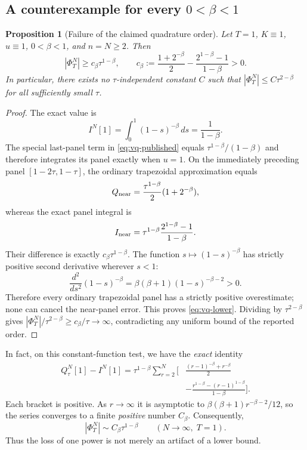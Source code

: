\documentclass[11pt,a4paper]{amsart}
\theoremstyle{remark}
\theoremstyle{plain}
\newtheorem{proposition}{Proposition}[section]
\theoremstyle{remark}
\numberwithin{equation}{section}
\begin{document}
\subsection{A counterexample for every $0<\beta<1$}
\begin{proposition}[Failure of the claimed quadrature order]\label{prop:vq-counter}
Let $T=1$, $K\equiv1$, $u\equiv1$, $0<\beta<1$, and $n=N\ge2$. Then
\begin{equation}\label{eq:vq-lower}
 |\Phi_T^N|\ge c_\beta\tau^{1-\beta},\qquad
 c_\beta:=\frac{1+2^{-\beta}}2
 -\frac{2^{1-\beta}-1}{1-\beta}>0.
\end{equation}
In particular, there exists no $\tau$-independent constant $C$ such that
$|\Phi_T^N|\le C\tau^{2-\beta}$ for all sufficiently small $\tau$.
\end{proposition}
\begin{proof}
The exact value is
\[
 I^N[1]=\int_0^1(1-s)^{-\beta}\,ds=\frac1{1-\beta}.
\]
The special last-panel term in \eqref{eq:vq-published} equals
$\tau^{1-\beta}/(1-\beta)$ and therefore integrates its panel exactly when $u=1$.
On the immediately preceding panel $[1-2\tau,1-\tau]$, the ordinary trapezoidal approximation equals
\[
 Q_{\rm near}=\frac{\tau^{1-\beta}}2(1+2^{-\beta}),
\]
whereas the exact panel integral is
\[
 I_{\rm near}=\tau^{1-\beta}
 \frac{2^{1-\beta}-1}{1-\beta}.
\]
Their difference is exactly $c_\beta\tau^{1-\beta}$. The function
$s\mapsto(1-s)^{-\beta}$ has strictly positive second derivative wherever $s<1$:
\[
 \frac{d^2}{ds^2}(1-s)^{-\beta}
 =\beta(\beta+1)(1-s)^{-\beta-2}>0.
\]
Therefore every ordinary trapezoidal panel has a strictly positive overestimate; none can cancel the near-panel error. This proves \eqref{eq:vq-lower}.
Dividing by $\tau^{2-\beta}$ gives
$|\Phi_T^N|/\tau^{2-\beta}\ge c_\beta/\tau\to\infty$, contradicting any uniform bound of the reported order.
\end{proof}

In fact, on this constant-function test, we have the \emph{exact} identity
\begin{equation}\label{eq:vq-error-sum}
\begin{aligned}
 Q_\tau^N[1]-I^N[1]=\tau^{1-\beta}\sum_{r=2}^N\bigg[
 &\frac{(r-1)^{-\beta}+r^{-\beta}}2\\
 &-\frac{r^{1-\beta}-(r-1)^{1-\beta}}{1-\beta}
 \bigg].
\end{aligned}
\end{equation}
Each bracket is positive. As $r\to\infty$ it is asymptotic to
$\beta(\beta+1)r^{-\beta-2}/12$, so the series converges to a finite \emph{positive} number $C_\beta$. Consequently,
\begin{equation}\label{eq:vq-sharp-constant}
 |\Phi_T^N|\sim C_\beta\tau^{1-\beta}
 \qquad(N\to\infty,\;T=1).
\end{equation}
Thus the loss of one power is not merely an artifact of a lower bound.
\end{document}
